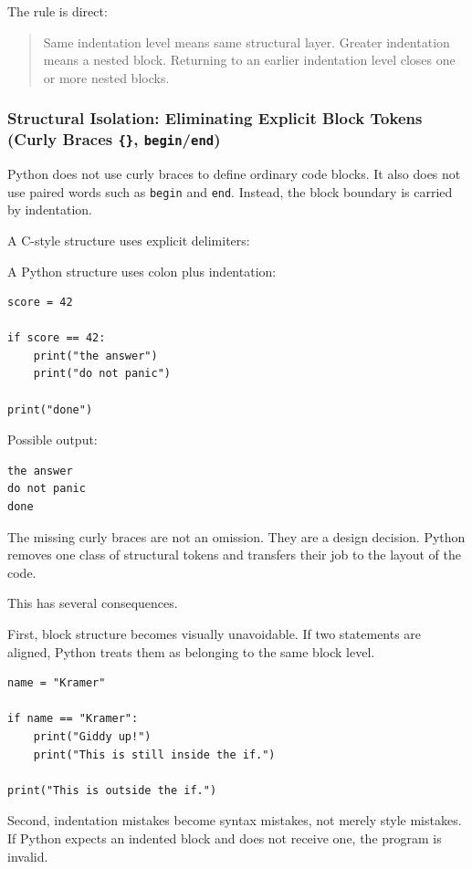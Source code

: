 The rule is direct:

\begin{quote}
Same indentation level means same structural layer. Greater indentation means a nested block. Returning to an earlier indentation level closes one or more nested blocks.
\end{quote}

\subsubsection{Structural Isolation: Eliminating Explicit Block Tokens (Curly Braces \texttt{\{\}}, \texttt{begin}/\texttt{end})}

Python does not use curly braces to define ordinary code blocks. It also does not use paired words such as \texttt{begin} and \texttt{end}. Instead, the block boundary is carried by indentation.

A C-style structure uses explicit delimiters:

A Python structure uses colon plus indentation:

\begin{verbatim}
score = 42

if score == 42:
    print("the answer")
    print("do not panic")

print("done")
\end{verbatim}

Possible output:

\begin{verbatim}
the answer
do not panic
done
\end{verbatim}

The missing curly braces are not an omission. They are a design decision. Python removes one class of structural tokens and transfers their job to the layout of the code.

This has several consequences.

First, block structure becomes visually unavoidable. If two statements are aligned, Python treats them as belonging to the same block level.

\begin{verbatim}
name = "Kramer"

if name == "Kramer":
    print("Giddy up!")
    print("This is still inside the if.")

print("This is outside the if.")
\end{verbatim}

Second, indentation mistakes become syntax mistakes, not merely style mistakes. If Python expects an indented block and does not receive one, the program is invalid.

